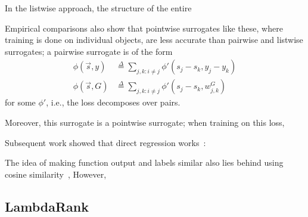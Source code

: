 In the listwise approach, the structure of the entire 

Empirical comparisons also show that pointwise
surrogates like these, where training is done on individual objects, are less
accurate than pairwise and listwise surrogates; a pairwise surrogate is of the
form
\begin{align*}
  \phi(\vec{s}, y)
  &\stackrel{\Delta}{=}
  \sum_{j,k : i \neq j} \phi'(s_j - s_k, y_j - y_k) \\
  \phi(\vec{s}, G)
  &\stackrel{\Delta}{=}
  \sum_{j,k : i \neq j} \phi'(s_j - s_k, w_{j,k}^G) 
\end{align*}
for some $\phi'$, i.e., the loss decomposes over pairs.

Moreover, this surrogate is a pointwise surrogate;
when training on this loss, 



Subsequent work showed that
direct regression works~\cite{ndcg-consistency}: 

The idea of making function output and labels similar
also lies behind using cosine similarity~\cite{rank-cosine}, 
However, 


\subsection{LambdaRank}
